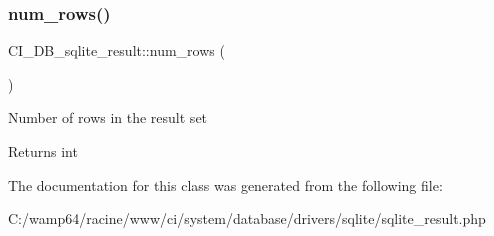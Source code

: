 \subsubsection{\texorpdfstring{num\+\_\+rows()}{num\_rows()}}
{\footnotesize\ttfamily C\+I\+\_\+\+D\+B\+\_\+sqlite\+\_\+result\+::num\+\_\+rows (\begin{DoxyParamCaption}{ }\end{DoxyParamCaption})}

Number of rows in the result set

\begin{DoxyReturn}{Returns}
int 
\end{DoxyReturn}


The documentation for this class was generated from the following file\+:\begin{DoxyCompactItemize}
\item 
C\+:/wamp64/racine/www/ci/system/database/drivers/sqlite/sqlite\+\_\+result.\+php\end{DoxyCompactItemize}
